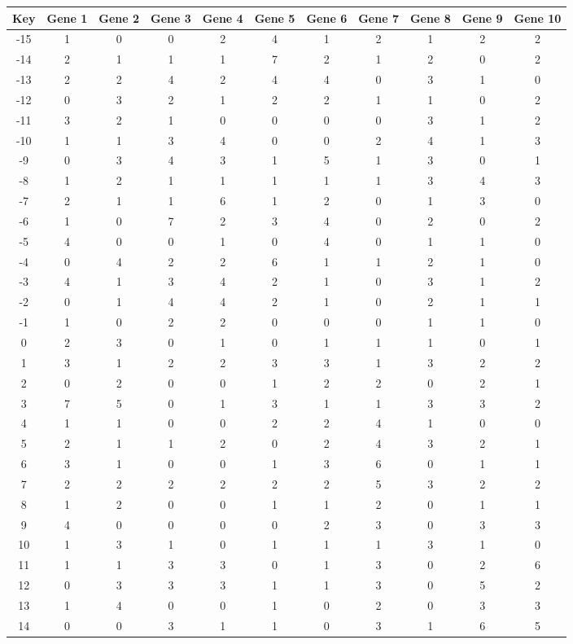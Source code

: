 \begin{tabular}{|c|c|c|c|c|c|c|c|c|c|c|}
\hline
Key & Gene 1 & Gene 2 & Gene 3 & Gene 4 & Gene 5 & Gene 6 & Gene 7 & Gene 8 & Gene 9 & Gene 10 \\
\hline
-15 & 1 & 0 & 0 & 2 & 4 & 1 & 2 & 1 & 2 & 2 \\
-14 & 2 & 1 & 1 & 1 & 7 & 2 & 1 & 2 & 0 & 2 \\
-13 & 2 & 2 & 4 & 2 & 4 & 4 & 0 & 3 & 1 & 0 \\
-12 & 0 & 3 & 2 & 1 & 2 & 2 & 1 & 1 & 0 & 2 \\
-11 & 3 & 2 & 1 & 0 & 0 & 0 & 0 & 3 & 1 & 2 \\
-10 & 1 & 1 & 3 & 4 & 0 & 0 & 2 & 4 & 1 & 3 \\
-9 & 0 & 3 & 4 & 3 & 1 & 5 & 1 & 3 & 0 & 1 \\
-8 & 1 & 2 & 1 & 1 & 1 & 1 & 1 & 3 & 4 & 3 \\
-7 & 2 & 1 & 1 & 6 & 1 & 2 & 0 & 1 & 3 & 0 \\
-6 & 1 & 0 & 7 & 2 & 3 & 4 & 0 & 2 & 0 & 2 \\
-5 & 4 & 0 & 0 & 1 & 0 & 4 & 0 & 1 & 1 & 0 \\
-4 & 0 & 4 & 2 & 2 & 6 & 1 & 1 & 2 & 1 & 0 \\
-3 & 4 & 1 & 3 & 4 & 2 & 1 & 0 & 3 & 1 & 2 \\
-2 & 0 & 1 & 4 & 4 & 2 & 1 & 0 & 2 & 1 & 1 \\
-1 & 1 & 0 & 2 & 2 & 0 & 0 & 0 & 1 & 1 & 0 \\
0 & 2 & 3 & 0 & 1 & 0 & 1 & 1 & 1 & 0 & 1 \\
1 & 3 & 1 & 2 & 2 & 3 & 3 & 1 & 3 & 2 & 2 \\
2 & 0 & 2 & 0 & 0 & 1 & 2 & 2 & 0 & 2 & 1 \\
3 & 7 & 5 & 0 & 1 & 3 & 1 & 1 & 3 & 3 & 2 \\
4 & 1 & 1 & 0 & 0 & 2 & 2 & 4 & 1 & 0 & 0 \\
5 & 2 & 1 & 1 & 2 & 0 & 2 & 4 & 3 & 2 & 1 \\
6 & 3 & 1 & 0 & 0 & 1 & 3 & 6 & 0 & 1 & 1 \\
7 & 2 & 2 & 2 & 2 & 2 & 2 & 5 & 3 & 2 & 2 \\
8 & 1 & 2 & 0 & 0 & 1 & 1 & 2 & 0 & 1 & 1 \\
9 & 4 & 0 & 0 & 0 & 0 & 2 & 3 & 0 & 3 & 3 \\
10 & 1 & 3 & 1 & 0 & 1 & 1 & 1 & 3 & 1 & 0 \\
11 & 1 & 1 & 3 & 3 & 0 & 1 & 3 & 0 & 2 & 6 \\
12 & 0 & 3 & 3 & 3 & 1 & 1 & 3 & 0 & 5 & 2 \\
13 & 1 & 4 & 0 & 0 & 1 & 0 & 2 & 0 & 3 & 3 \\
14 & 0 & 0 & 3 & 1 & 1 & 0 & 3 & 1 & 6 & 5 \\
\hline
\end{tabular}